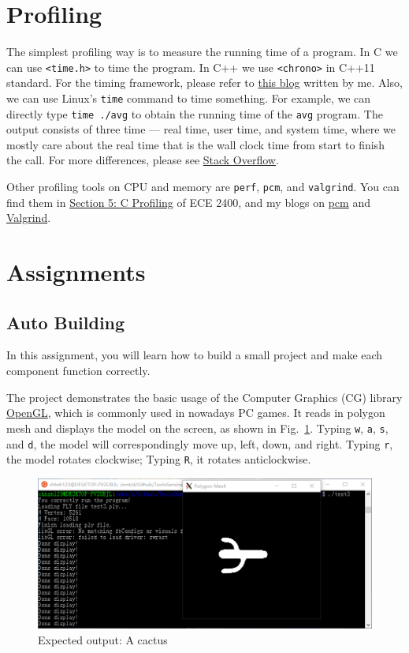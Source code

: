 \documentclass[english]{../TexTemplate/thesis}
\begin{document}
\section{Profiling}
The simplest profiling way is to measure the running time of a program.
In C we can use \verb'<time.h>' to time the program.
In C++ we use \verb'<chrono>' in C++11 standard.
For the timing framework, please refer to \href{https://chhzh123.github.io/blogs/2019-03-31-c-timing/}{this blog} written by me.
Also, we can use Linux's \verb'time' command to time something.
For example, we can directly type \verb'time ./avg' to obtain the running time of the \verb'avg' program.
The output consists of three time --- real time, user time, and system time, where we mostly care about the real time that is the wall clock time from start to finish the call.
For more differences, please see \href{https://stackoverflow.com/questions/556405/what-do-real-user-and-sys-mean-in-the-output-of-time1}{Stack Overflow}.

Other profiling tools on CPU and memory are \verb'perf', \verb'pcm', and \verb'valgrind'.
You can find them in \href{https://cornell-ece2400.github.io/ece2400-docs/ece2400-sec5-c-profiling/}{Section 5: C Profiling} of ECE 2400, and my blogs on \href{https://chhzh123.github.io/blogs/2019-02-19-pcm/}{pcm} and \href{https://chhzh123.github.io/blogs/2019-02-27-spa-extra-1/}{Valgrind}.

\newpage
\section{Assignments}
\subsection{Auto Building}
In this assignment, you will learn how to build a small project and make each component function correctly.

The project demonstrates the basic usage of the Computer Graphics (CG) library \href{https://www.opengl.org}{OpenGL}, which is commonly used in nowadays PC games.
It reads in polygon mesh and displays the model on the screen, as shown in Fig.~\ref{fig:cactus}.
Typing \verb'w', \verb'a', \verb's', and \verb'd', the model will correspondingly move up, left, down, and right.
Typing \verb'r', the model rotates clockwise; Typing \verb'R', it rotates anticlockwise.
\begin{figure}[H]
\centering
\includegraphics[width=\linewidth]{fig/assignments/autobuild_result.png}
\caption{Expected output: A cactus}
\label{fig:cactus}
\end{figure}
\end{document}
